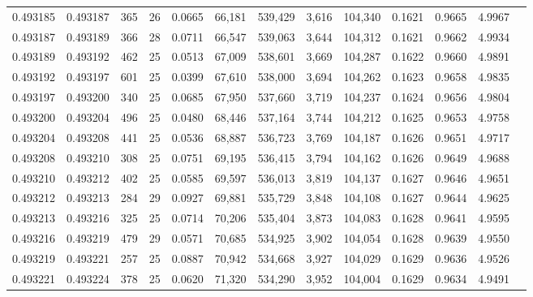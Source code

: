 \begin{tabular}{rrrrrrrrrrrrr}
0.493185 & 0.493187 & 365 &  26 &                                     0.0665 &  66,181 & 539,429 &   3,616 & 104,340 & 0.1621 & 0.9665 & 4.9967 \\
0.493187 & 0.493189 & 366 &  28 &                                     0.0711 &  66,547 & 539,063 &   3,644 & 104,312 & 0.1621 & 0.9662 & 4.9934 \\
0.493189 & 0.493192 & 462 &  25 &                                     0.0513 &  67,009 & 538,601 &   3,669 & 104,287 & 0.1622 & 0.9660 & 4.9891 \\
0.493192 & 0.493197 & 601 &  25 &                                     0.0399 &  67,610 & 538,000 &   3,694 & 104,262 & 0.1623 & 0.9658 & 4.9835 \\
0.493197 & 0.493200 & 340 &  25 &                                     0.0685 &  67,950 & 537,660 &   3,719 & 104,237 & 0.1624 & 0.9656 & 4.9804 \\
0.493200 & 0.493204 & 496 &  25 &                                     0.0480 &  68,446 & 537,164 &   3,744 & 104,212 & 0.1625 & 0.9653 & 4.9758 \\
0.493204 & 0.493208 & 441 &  25 &                                     0.0536 &  68,887 & 536,723 &   3,769 & 104,187 & 0.1626 & 0.9651 & 4.9717 \\
0.493208 & 0.493210 & 308 &  25 &                                     0.0751 &  69,195 & 536,415 &   3,794 & 104,162 & 0.1626 & 0.9649 & 4.9688 \\
0.493210 & 0.493212 & 402 &  25 &                                     0.0585 &  69,597 & 536,013 &   3,819 & 104,137 & 0.1627 & 0.9646 & 4.9651 \\
0.493212 & 0.493213 & 284 &  29 &                                     0.0927 &  69,881 & 535,729 &   3,848 & 104,108 & 0.1627 & 0.9644 & 4.9625 \\
0.493213 & 0.493216 & 325 &  25 &                                     0.0714 &  70,206 & 535,404 &   3,873 & 104,083 & 0.1628 & 0.9641 & 4.9595 \\
0.493216 & 0.493219 & 479 &  29 &                                     0.0571 &  70,685 & 534,925 &   3,902 & 104,054 & 0.1628 & 0.9639 & 4.9550 \\
0.493219 & 0.493221 & 257 &  25 &                                     0.0887 &  70,942 & 534,668 &   3,927 & 104,029 & 0.1629 & 0.9636 & 4.9526 \\
0.493221 & 0.493224 & 378 &  25 &                                     0.0620 &  71,320 & 534,290 &   3,952 & 104,004 & 0.1629 & 0.9634 & 4.9491 \\

\end{tabular}
